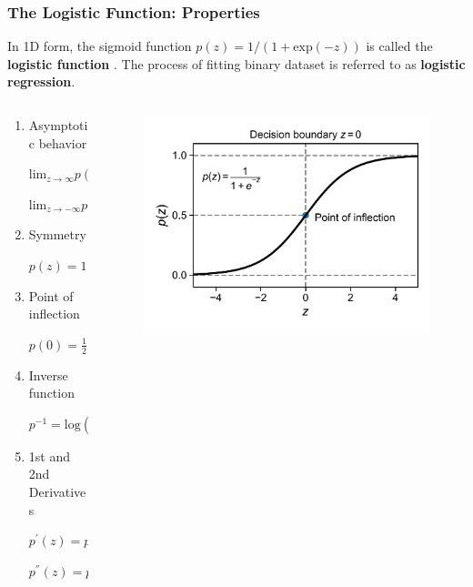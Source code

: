 \documentclass[10pt,aspectratio=169]{beamer}
\begin{document}
\begin{frame}
  \frametitle{The Logistic Function: Properties}
  
  In 1D form, the sigmoid function $p(z) = 1/(1 + \mathrm{exp}(-z))$
  is called the \textbf{logistic function} .
  The process of fitting binary dataset is referred to as
  \textbf{logistic regression}.

  \begin{columns}[T]
    \begin{column}{0.5\textwidth}
      \begin{enumerate}
      \item Asymptotic behavior
          
        $\mathrm{lim}_{z\to\infty} p(z) = 1$
          
        $\mathrm{lim}_{z\to-\infty} p(z) = 0$
          
      \item Symmetry

        $p(z) = 1 - p(-z)$
          
      \item Point of inflection

        $p(0) = \frac{1}{2}$
          
      \item Inverse function

        $p^{-1} = \mathrm{log}(\frac{p}{1 - p})$

      \item 1st and 2nd Derivatives

        $p^{'}(z) = p(z)(1 - p(z))$

        $p^{''}(z) = p'(z)(1 - 2 p(z))$
      \end{enumerate}
    \end{column}

    \begin{column}{0.5\textwidth}

        \begin{figure}[t]
          \includegraphics[width=\textwidth]{scripts/logistic_fun_alone.pdf}
        \end{figure}
        

\end{column}
\end{columns}
\end{frame}
\end{document}

